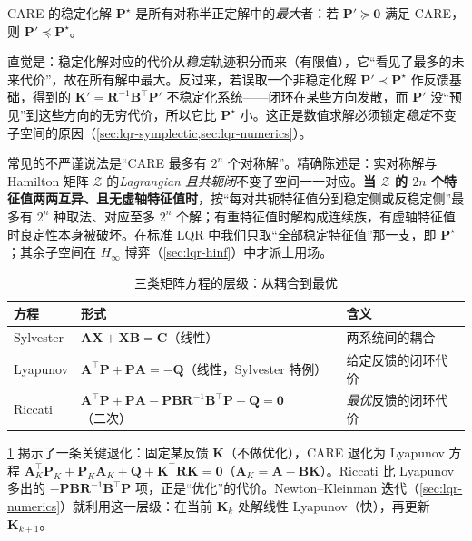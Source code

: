 \begin{theorem}[稳定化解 $=$ 最大半正定解]\label{thm:lqr-maximal}
CARE 的稳定化解 $\mathbf P^\star$ 是所有对称半正定解中的\emph{最大}者：若 $\mathbf P'\succeq\mathbf0$ 满足 CARE，则 $\mathbf P'\preceq\mathbf P^\star$。
\end{theorem}

直觉是：稳定化解对应的代价从\emph{稳定}轨迹积分而来（有限值），它“看见了最多的未来代价”，故在所有解中最大。反过来，若误取一个非稳定化解 $\mathbf P'\prec\mathbf P^\star$ 作反馈基础，得到的 $\mathbf K'=\mathbf R^{-1}\mathbf B^\top\mathbf P'$ 不稳定化系统——闭环在某些方向发散，而 $\mathbf P'$ 没“预见”到这些方向的无穷代价，所以它比 $\mathbf P^\star$ 小。这正是数值求解必须锁定\emph{稳定}不变子空间的原因（\cref{sec:lqr-symplectic,sec:lqr-numerics}）。

\begin{pitfall}
常见的不严谨说法是“CARE 最多有 $2^n$ 个对称解”。精确陈述是：实对称解与 Hamilton 矩阵 $\mathcal Z$ 的\emph{Lagrangian 且共轭闭}不变子空间一一对应。\textbf{当 $\mathcal Z$ 的 $2n$ 个特征值两两互异、且无虚轴特征值时}，按“每对共轭特征值分到稳定侧或反稳定侧”最多有 $2^n$ 种取法、对应至多 $2^n$ 个解；有重特征值时解构成连续族，有虚轴特征值时良定性本身被破坏\cite{lancaster1995algebraic}。在标准 LQR 中我们只取“全部稳定特征值”那一支，即 $\mathbf P^\star$；其余子空间在 $H_\infty$ 博弈（\cref{sec:lqr-hinf}）中才派上用场。
\end{pitfall}

\begin{table}[H]\centering\small
\caption{三类矩阵方程的层级：从耦合到最优}
\label{tab:lqr-ric-lyap}
\begin{tabular}{lll}
\toprule
方程 & 形式 & 含义 \\
\midrule
Sylvester & $\mathbf A\mathbf X+\mathbf X\mathbf B=\mathbf C$（线性） & 两系统间的耦合 \\
Lyapunov & $\mathbf A^\top\mathbf P+\mathbf P\mathbf A=-\mathbf Q$（线性，Sylvester 特例） & 给定反馈的闭环代价 \\
Riccati & $\mathbf A^\top\mathbf P+\mathbf P\mathbf A-\mathbf P\mathbf B\mathbf R^{-1}\mathbf B^\top\mathbf P+\mathbf Q=\mathbf0$（二次） & \emph{最优}反馈的闭环代价 \\
\bottomrule
\end{tabular}
\end{table}

\cref{tab:lqr-ric-lyap} 揭示了一条关键退化：固定某反馈 $\mathbf K$（不做优化），CARE 退化为 Lyapunov 方程 $\mathbf A_K^\top\mathbf P_K+\mathbf P_K\mathbf A_K+\mathbf Q+\mathbf K^\top\mathbf R\mathbf K=\mathbf0$（$\mathbf A_K=\mathbf A-\mathbf B\mathbf K$）。Riccati 比 Lyapunov 多出的 $-\mathbf P\mathbf B\mathbf R^{-1}\mathbf B^\top\mathbf P$ 项，正是“优化”的代价。Newton--Kleinman 迭代（\cref{sec:lqr-numerics}）就利用这一层级：在当前 $\mathbf K_k$ 处解线性 Lyapunov（快），再更新 $\mathbf K_{k+1}$。

